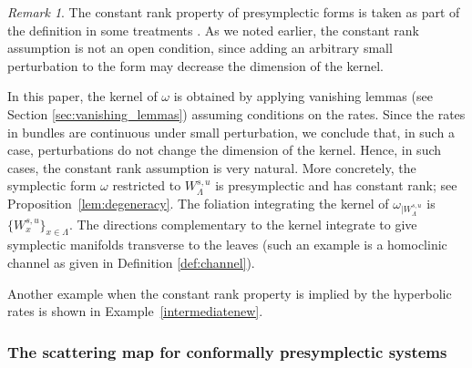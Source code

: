 \documentclass[11pt]{amsart}
\theoremstyle{definition}
\theoremstyle{remark}
\newtheorem{rem}[thm]{Remark}
\numberwithin{equation}{section}
\begin{document}
\begin{rem}\label{rem:constant_rank}
  The constant rank property of presymplectic forms is taken as part of the definition
   in some treatments \cite{Souriau97,LibermannM87}.
   As we noted earlier, the constant rank assumption is not an open condition,
   since adding an arbitrary  small perturbation to the
  form may decrease the dimension of the  kernel.


In this paper, the kernel of $\omega$ is obtained by
applying  vanishing lemmas (see Section \ref{sec:vanishing_lemmas}) assuming conditions on the rates.
Since the rates in bundles are continuous under small perturbation, we conclude
that, in such a case, perturbations do not change the dimension of the kernel.
Hence, in such cases,  the constant rank assumption is very natural.
More concretely, the symplectic form $\omega$ restricted to $W^{s,u}_\Lambda$ is presymplectic and
has constant rank; see Proposition~\ref{lem:degeneracy}.
The foliation integrating the kernel of $\omega_{\mid W^{s,u}_\Lambda}$ is $\{W^{s,u}_x\}_{x\in\Lambda}$.
The directions complementary to the kernel integrate to give  symplectic manifolds transverse to the leaves (such an example is a homoclinic channel as given in Definition \ref{def:channel}).

Another example when the constant rank property is implied by the hyperbolic rates is shown in Example~\ref{intermediatenew}.
 \end{rem}


\subsubsection{The scattering map for conformally presymplectic systems}
\end{document}
